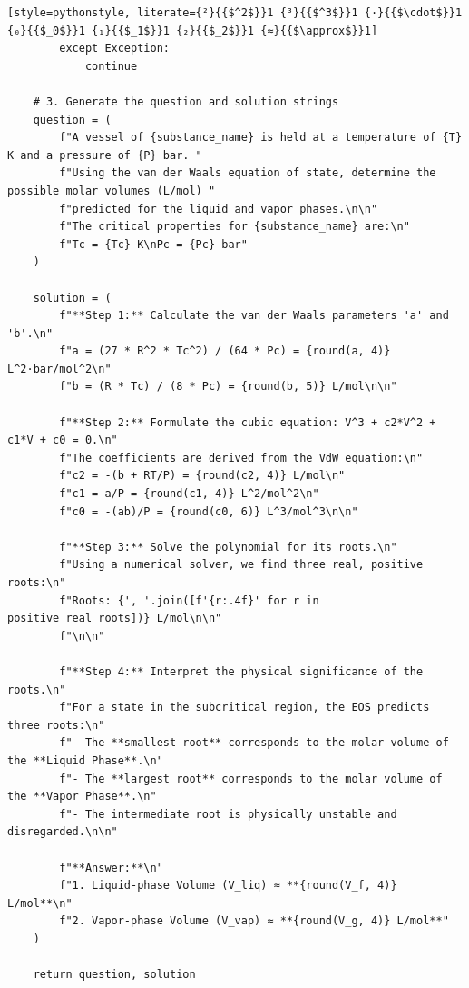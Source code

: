 \begin{lstlisting}[style=pythonstyle, literate={²}{{$^2$}}1 {³}{{$^3$}}1 {·}{{$\cdot$}}1 {₀}{{$_0$}}1 {₁}{{$_1$}}1 {₂}{{$_2$}}1 {≈}{{$\approx$}}1]
        except Exception:
            continue

    # 3. Generate the question and solution strings
    question = (
        f"A vessel of {substance_name} is held at a temperature of {T} K and a pressure of {P} bar. "
        f"Using the van der Waals equation of state, determine the possible molar volumes (L/mol) "
        f"predicted for the liquid and vapor phases.\n\n"
        f"The critical properties for {substance_name} are:\n"
        f"Tc = {Tc} K\nPc = {Pc} bar"
    )

    solution = (
        f"**Step 1:** Calculate the van der Waals parameters 'a' and 'b'.\n"
        f"a = (27 * R^2 * Tc^2) / (64 * Pc) = {round(a, 4)} L^2·bar/mol^2\n"
        f"b = (R * Tc) / (8 * Pc) = {round(b, 5)} L/mol\n\n"

        f"**Step 2:** Formulate the cubic equation: V^3 + c2*V^2 + c1*V + c0 = 0.\n"
        f"The coefficients are derived from the VdW equation:\n"
        f"c2 = -(b + RT/P) = {round(c2, 4)} L/mol\n"
        f"c1 = a/P = {round(c1, 4)} L^2/mol^2\n"
        f"c0 = -(ab)/P = {round(c0, 6)} L^3/mol^3\n\n"

        f"**Step 3:** Solve the polynomial for its roots.\n"
        f"Using a numerical solver, we find three real, positive roots:\n"
        f"Roots: {', '.join([f'{r:.4f}' for r in positive_real_roots])} L/mol\n\n"
        f"\n\n"

        f"**Step 4:** Interpret the physical significance of the roots.\n"
        f"For a state in the subcritical region, the EOS predicts three roots:\n"
        f"- The **smallest root** corresponds to the molar volume of the **Liquid Phase**.\n"
        f"- The **largest root** corresponds to the molar volume of the **Vapor Phase**.\n"
        f"- The intermediate root is physically unstable and disregarded.\n\n"

        f"**Answer:**\n"
        f"1. Liquid-phase Volume (V_liq) ≈ **{round(V_f, 4)} L/mol**\n"
        f"2. Vapor-phase Volume (V_vap) ≈ **{round(V_g, 4)} L/mol**"
    )

    return question, solution
\end{lstlisting}
